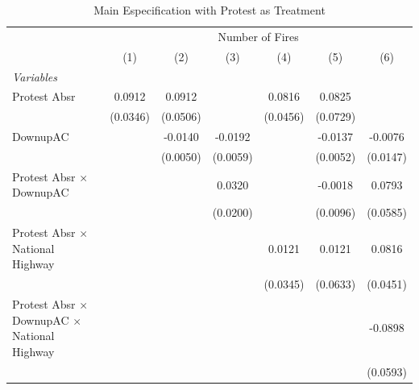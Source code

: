 
\begin{table}[htbp]
   \caption{\label{tab:protest_treat_main} Main Especification with Protest as Treatment}
   \centering
   \begin{tabular}{lcccccc}
      \tabularnewline \midrule \midrule
       & \multicolumn{6}{c}{Number of Fires}\\
                                                                 & (1)           & (2)           & (3)           & (4)           & (5)           & (6)\\  
      \midrule
      \emph{Variables}\\
      Protest Absr                                               & 0.0912        & 0.0912        &               & 0.0816        & 0.0825        &   \\   
                                                                 & (0.0346)      & (0.0506)      &               & (0.0456)      & (0.0729)      &   \\   
      DownupAC                                                   &               & -0.0140       & -0.0192       &               & -0.0137       & -0.0076\\   
                                                                 &               & (0.0050)      & (0.0059)      &               & (0.0052)      & (0.0147)\\   
      Protest Absr $\times$ DownupAC                             &               &               & 0.0320        &               & -0.0018       & 0.0793\\   
                                                                 &               &               & (0.0200)      &               & (0.0096)      & (0.0585)\\   
      Protest Absr $\times$ National Highway                     &               &               &               & 0.0121        & 0.0121        & 0.0816\\   
                                                                 &               &               &               & (0.0345)      & (0.0633)      & (0.0451)\\   
      Protest Absr $\times$ DownupAC $\times$ National Highway   &               &               &               &               &               & -0.0898\\   
                                                                 &               &               &               &               &               & (0.0593)\\   

\end{tabular}
\end{table}
